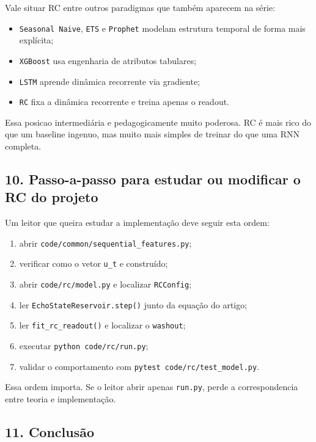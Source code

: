 \documentclass[12pt]{article}
\providecommand{\tightlist}{%
  \setlength{\itemsep}{0pt}\setlength{\parskip}{0pt}}
\begin{document}
Vale situar RC entre outros paradigmas que também aparecem na série:

\begin{itemize}
\tightlist
\item
  \texttt{Seasonal\ Naive}, \texttt{ETS} e \texttt{Prophet} modelam estrutura temporal de forma mais explícita;
\item
  \texttt{XGBoost} usa engenharia de atributos tabulares;
\item
  \texttt{LSTM} aprende dinâmica recorrente via gradiente;
\item
  \texttt{RC} fixa a dinâmica recorrente e treina apenas o readout.
\end{itemize}

Essa posicao intermediária e pedagogicamente muito poderosa. RC é mais rico do que um baseline ingenuo, mas muito mais simples de treinar do que uma RNN completa.

\subsection{10. Passo-a-passo para estudar ou modificar o RC do projeto}\label{10-passo-a-passo-para-estudar-ou-modificar-o-rc-do-projeto}

Um leitor que queira estudar a implementação deve seguir esta ordem:

\begin{enumerate}
\def\labelenumi{\arabic{enumi}.}
\tightlist
\item
  abrir \texttt{code/common/sequential\_features.py};
\item
  verificar como o vetor \texttt{u\_t} e construído;
\item
  abrir \texttt{code/rc/model.py} e localizar \texttt{RCConfig};
\item
  ler \texttt{EchoStateReservoir.step()} junto da equação do artigo;
\item
  ler \texttt{fit\_rc\_readout()} e localizar o \texttt{washout};
\item
  executar \texttt{python\ code/rc/run.py};
\item
  validar o comportamento com \texttt{pytest\ code/rc/test\_model.py}.
\end{enumerate}

Essa ordem importa. Se o leitor abrir apenas \texttt{run.py}, perde a correspondencia entre teoria e implementação.

\subsection{11. Conclusão}\label{11-conclusuxe3o}
\end{document}

